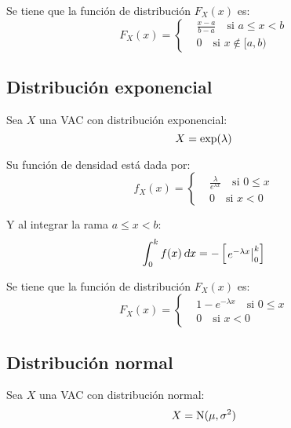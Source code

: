 \documentclass[a5paper,12pt,twoside]{book}
\begin{document}
Se tiene que la función de distribución $F_X(x)$ es:
\begin{equation*}
    F_X(x) =
    \left\{
    \begin{aligned}
        & \frac{x-a}{b-a} \quad \text{si } a \leq x < b
        \\
        & 0 \quad \text{si } x \notin [a,b)
    \end{aligned}
    \right.
\end{equation*}


\subsection{Distribución exponencial}

Sea $X$ una VAC con distribución exponencial:
\begin{equation*}
    X = \operatorname{exp}(\lambda)
\end{equation*}

Su función de densidad está dada por:
\begin{equation*}
    f_X(x) =
    \left\{
    \begin{aligned}
        & \frac{\lambda}{e^{\lambda x}} \quad \text{si } 0 \leq x
        \\[1ex]
        & 0 \quad \text{si } x < 0
    \end{aligned}
    \right.
\end{equation*}

Y al integrar la rama $a \leq x < b$:
\begin{equation*}
    \int_0^k f(x) \, \textsl{d} x = -\begin{bmatrix} \left. e^{-\lambda x} \right|_{0}^{k} \end{bmatrix}
\end{equation*}

Se tiene que la función de distribución $F_X(x)$ es:
\begin{equation*}
    F_X(x) =
    \left\{
    \begin{aligned}
        & 1-e^{-\lambda x} \quad \text{si } 0 \leq x
        \\
        & 0 \quad \text{si } x < 0
    \end{aligned}
    \right.
\end{equation*}


\subsection{Distribución normal}

Sea $X$ una VAC con distribución normal:
\begin{equation}
    X = \operatorname{N}(\mu,\sigma^2)
\end{equation}
\end{document}
